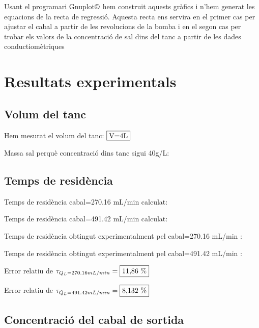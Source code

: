 \documentclass[10pt, twoside]{article}
\begin{document}
Usant el programari Gnuplot$\copyright$ hem construit aquests gràfics i n'hem generat les equacions de la recta de regressió.
Aquesta recta ens servira en el primer cas per ajustar el cabal a partir de les revolucions de la bomba i en el segon cas per trobar els valors de la concentració de sal dins del tanc a partir de les dades conductiomètriques

\section{Resultats experimentals}

\subsection{Volum del tanc}
Hem mesurat el volum del tanc: $\fbox{V=4L}$

Massa sal perquè concentració dins tanc sigui 40g/L: 

\subsection{Temps de residència}
Temps de residència cabal=270.16 mL/min calculat: 

Temps de residència cabal=491.42 mL/min calculat: 

Temps de residència obtingut experimentalment pel cabal=270.16 mL/min : 

Temps de residència obtingut experimentalment pel cabal=491.42 mL/min : 

Error relatiu de $\tau_{Q_L = 270.16 mL/min} = \fbox{11,86 \%}$

Error relatiu de $\tau_{Q_L = 491.42 mL/min} = \fbox{8,132 \%}$

\subsection{Concentració del cabal de sortida}
\end{document}
